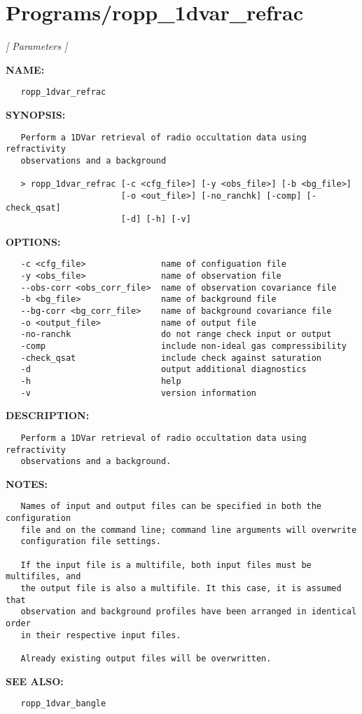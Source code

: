 \section{Programs/ropp\_1dvar\_refrac}
\textsl{[ Parameters ]}

\label{ch:robo46}
\label{ch:Programs_ropp_1dvar_refrac}
\textbf{NAME:}\hspace{0.08in}\begin{Verbatim}
   ropp_1dvar_refrac
\end{Verbatim}
\textbf{SYNOPSIS:}\hspace{0.08in}\begin{Verbatim}
   Perform a 1DVar retrieval of radio occultation data using refractivity
   observations and a background

   > ropp_1dvar_refrac [-c <cfg_file>] [-y <obs_file>] [-b <bg_file>]
                       [-o <out_file>] [-no_ranchk] [-comp] [-check_qsat]
                       [-d] [-h] [-v]
\end{Verbatim}
\textbf{OPTIONS:}\hspace{0.08in}\begin{Verbatim}
   -c <cfg_file>               name of configuation file
   -y <obs_file>               name of observation file
   --obs-corr <obs_corr_file>  name of observation covariance file
   -b <bg_file>                name of background file
   --bg-corr <bg_corr_file>    name of background covariance file
   -o <output_file>            name of output file
   -no-ranchk                  do not range check input or output
   -comp                       include non-ideal gas compressibility
   -check_qsat                 include check against saturation
   -d                          output additional diagnostics
   -h                          help
   -v                          version information
\end{Verbatim}
\textbf{DESCRIPTION:}\hspace{0.08in}\begin{Verbatim}
   Perform a 1DVar retrieval of radio occultation data using refractivity
   observations and a background.
\end{Verbatim}
\textbf{NOTES:}\hspace{0.08in}\begin{Verbatim}
   Names of input and output files can be specified in both the configuration
   file and on the command line; command line arguments will overwrite
   configuration file settings.

   If the input file is a multifile, both input files must be multifiles, and
   the output file is also a multifile. It this case, it is assumed that
   observation and background profiles have been arranged in identical order
   in their respective input files.

   Already existing output files will be overwritten.
\end{Verbatim}
\textbf{SEE ALSO:}\hspace{0.08in}\begin{Verbatim}
   ropp_1dvar_bangle
\end{Verbatim}
